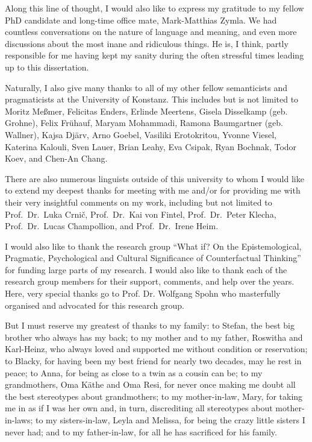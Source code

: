 Along this line of thought, I would also like to express my gratitude to my fellow PhD candidate and long-time office mate, Mark-Matthias Zymla. We had countless conversations on the nature of language and meaning, and even more discussions about the most inane and ridiculous things. He is, I think, partly responsible for me having kept my sanity during the often stressful times leading up to this dissertation.

Naturally, I also give many thanks to all of my other fellow semanticists and pragmaticists at the University of Konstanz. This includes but is not limited to Moritz Meßmer, Felicitas Enders, Erlinde Meertens, Gisela Disselkamp (geb. Grohne), Felix Frühauf, Maryam Mohammadi, Ramona Baumgartner (geb. Wallner), Kajsa Dj\"{a}rv, Arno Goebel, Vasiliki Erotokritou, Yvonne Viesel, Katerina Kalouli, Sven Lauer, Brian Leahy, Eva Csipak, Ryan Bochnak, Todor Koev, and Chen-An Chang.

There are also numerous linguists outside of this university to whom I would like to extend my deepest thanks for meeting with me and/or for providing me with their very insightful comments on my work, including but not limited to Prof.~Dr.~Luka Crni\v{c}, Prof.~Dr.~Kai von Fintel, Prof.~Dr.~Peter Klecha, Prof.~Dr.~Lucas Champollion, and Prof.~Dr.~Irene Heim.

I would also like to thank the research group \enquote{What if? On the Epistemological, Pragmatic, Psychological and Cultural Significance of Counterfactual Thinking} for funding large parts of my research. I would also like to thank each of the research group members for their support, comments, and help over the years. Here, very special thanks go to Prof. Dr. Wolfgang Spohn who masterfully organised and advocated for this research group.

But I must reserve my greatest of thanks to my family: to Stefan, the best big brother who always has my back; to my mother and to my father, Roswitha and Karl-Heinz, who always loved and supported me without condition or reservation; to Blacky, for having been my best friend for nearly two decades, may he rest in peace; to Anna, for being as close to a twin as a cousin can be; to my grandmothers, Oma K\"athe and Oma Resi, for never once making me doubt all the best stereotypes about grandmothers; to my mother-in-law, Mary, for taking me in as if I was her own and, in turn, discrediting all stereotypes about mother-in-laws; to my sisters-in-law, Leyla and Melissa, for being the crazy little sisters I never had; and to my father-in-law, for all he has sacrificed for his family.

